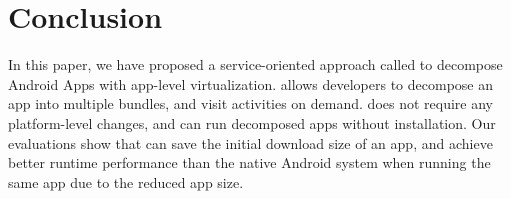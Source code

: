 \section{Conclusion}
\label{sec:conclusion}


In this paper, we have proposed a service-oriented approach called \nickName{} to decompose Android Apps with app-level virtualization. \nickName{} allows developers to decompose an app into multiple bundles, and visit activities on demand. \nickName{} does not require any platform-level changes, and can run decomposed apps without installation. Our evaluations show that \nickName{} can save the initial download size of an app, and achieve better runtime performance than the native Android system when running the same app due to the reduced app size. 